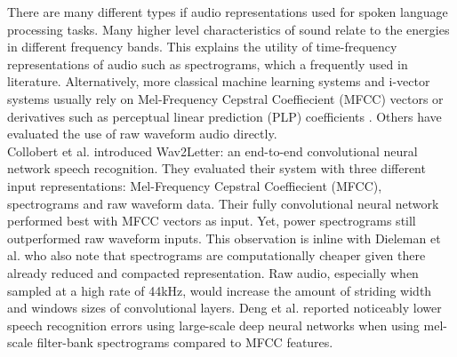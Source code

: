 There are many different types if audio representations used for spoken language processing tasks. Many higher level characteristics of sound relate to the energies in different frequency bands. This explains the utility of time-frequency representations of audio such as spectrograms, which a frequently used in literature.\cite{montavon2009deep, dieleman2013, multiscalelee2009unsupervised, wulfing2012unsupervised, henaff2011unsupervised} Alternatively, more classical machine learning systems and i-vector systems usually rely on Mel-Frequency Cepstral Coeffiecient (MFCC) vectors\cite{richardson2015unified, dehak2011front, garcia2011analysis} or derivatives such as perceptual linear prediction (PLP) coefficients \cite{gonzalez2014automatic}. Others have evaluated the use of raw waveform audio directly\cite{dieleman2014end, collobert2016wav2letter}.\\
Collobert et al. introduced Wav2Letter\cite{collobert2016wav2letter}: an end-to-end convolutional neural network speech recognition. They evaluated their system with three different input representations: Mel-Frequency Cepstral Coeffiecient (MFCC), spectrograms and raw waveform data. Their fully convolutional neural network performed best with MFCC vectors as input. Yet, power spectrograms still outperformed raw waveform inputs. This observation is inline with Dieleman et al.\cite{dieleman2014end} who also note that spectrograms are computationally cheaper given there already reduced and compacted representation. Raw audio, especially when sampled at a high rate of 44kHz, would increase the amount of striding width and windows sizes of convolutional layers.  
Deng et al. \cite{deng2013recent} reported noticeably lower speech recognition errors using large-scale deep neural networks when using mel-scale filter-bank spectrograms compared to MFCC features. 


